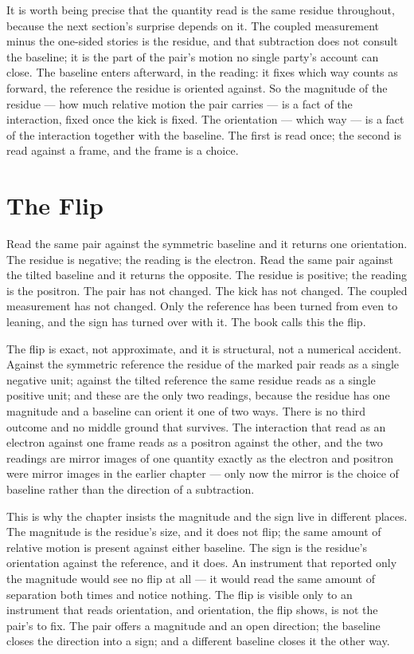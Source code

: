 It is worth being precise that the quantity read is the same residue throughout, because the
next section's surprise depends on it. The coupled measurement minus the one-sided stories
is the residue, and that subtraction does not consult the baseline; it is the part of the
pair's motion no single party's account can close. The baseline enters afterward, in the
reading: it fixes which way counts as forward, the reference the residue is oriented against.
So the magnitude of the residue --- how much relative motion the pair carries --- is a fact of
the interaction, fixed once the kick is fixed. The orientation --- which way --- is a fact of
the interaction together with the baseline. The first is read once; the second is read
against a frame, and the frame is a choice.

\section{The Flip}

Read the same pair against the symmetric baseline and it returns one orientation. The residue
is negative; the reading is the electron. Read the same pair against the tilted baseline and
it returns the opposite. The residue is positive; the reading is the positron. The pair has
not changed. The kick has not changed. The coupled measurement has not changed. Only the
reference has been turned from even to leaning, and the sign has turned over with it. The
book calls this the flip.

The flip is exact, not approximate, and it is structural, not a numerical accident. Against
the symmetric reference the residue of the marked pair reads as a single negative unit;
against the tilted reference the same residue reads as a single positive unit; and these are
the only two readings, because the residue has one magnitude and a baseline can orient it one
of two ways. There is no third outcome and no middle ground that survives. The interaction
that read as an electron against one frame reads as a positron against the other, and the two
readings are mirror images of one quantity exactly as the electron and positron were mirror
images in the earlier chapter --- only now the mirror is the choice of baseline rather than the
direction of a subtraction.

This is why the chapter insists the magnitude and the sign live in different places. The
magnitude is the residue's size, and it does not flip; the same amount of relative motion is
present against either baseline. The sign is the residue's orientation against the reference,
and it does. An instrument that reported only the magnitude would see no flip at all --- it
would read the same amount of separation both times and notice nothing. The flip is visible
only to an instrument that reads orientation, and orientation, the flip shows, is not the
pair's to fix. The pair offers a magnitude and an open direction; the baseline closes the
direction into a sign; and a different baseline closes it the other way.


